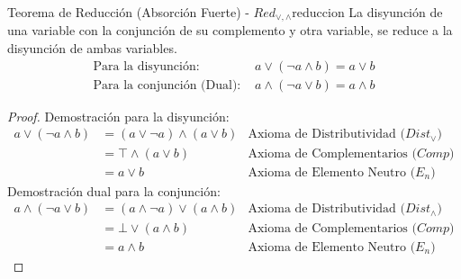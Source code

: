 \begin{teorema}{Teorema de Reducción (Absorción Fuerte) - $Red_{\vee, \wedge}$}{reduccion}
La disyunción de una variable con la conjunción de su complemento y otra variable, se reduce a la disyunción de ambas variables.
\begin{align*}
    \text{Para la disyunción: } & a \vee (\neg a \wedge b) = a \vee b \\
    \text{Para la conjunción (Dual): } & a \wedge (\neg a \vee b) = a \wedge b
\end{align*}
\tcblower
\begin{proof}
Demostración para la disyunción:
\begin{align*}
    a \vee (\neg a \wedge b) &= (a \vee \neg a) \wedge (a \vee b) & \text{Axioma de Distributividad ($Dist_{\vee}$)} \\
    &= \top \wedge (a \vee b) & \text{Axioma de Complementarios ($Comp$)} \\
    &= a \vee b & \text{Axioma de Elemento Neutro ($E_n$)}
\end{align*}
Demostración dual para la conjunción:
\begin{align*}
    a \wedge (\neg a \vee b) &= (a \wedge \neg a) \vee (a \wedge b) & \text{Axioma de Distributividad ($Dist_{\wedge}$)} \\
    &= \bot \vee (a \wedge b) & \text{Axioma de Complementarios ($Comp$)} \\
    &= a \wedge b & \text{Axioma de Elemento Neutro ($E_n$)}
\end{align*}
\end{proof}
\end{teorema}

